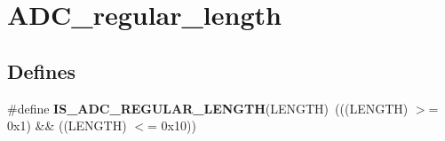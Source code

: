 \hypertarget{group__ADC__regular__length}{
\section{ADC\_\-regular\_\-length}
\label{group__ADC__regular__length}
}
\subsection*{Defines}
\begin{DoxyCompactItemize}
\item 
\hypertarget{group__ADC__regular__length_ga1ea82167f6dccdef1d160675f4534584}{
\#define {\bfseries IS\_\-ADC\_\-REGULAR\_\-LENGTH}(LENGTH)~(((LENGTH) $>$= 0x1) \&\& ((LENGTH) $<$= 0x10))}
\label{group__ADC__regular__length_ga1ea82167f6dccdef1d160675f4534584}

\end{DoxyCompactItemize}
